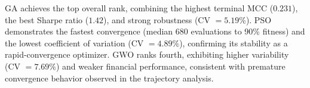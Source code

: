 GA achieves the top overall rank, combining the highest terminal MCC ($0.231$), the best Sharpe ratio ($1.42$), and strong robustness (CV $= 5.19\%$). PSO demonstrates the fastest convergence (median 680 evaluations to 90\% fitness) and the lowest coefficient of variation (CV $= 4.89\%$), confirming its stability as a rapid-convergence optimizer. GWO ranks fourth, exhibiting higher variability (CV $= 7.69\%$) and weaker financial performance, consistent with premature convergence behavior observed in the trajectory analysis.
